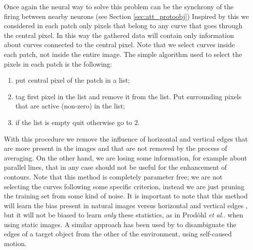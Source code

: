 \documentclass{llncs}
\makeatletter
\DeclareRobustCommand\onedot{\futurelet\@let@token\@onedot}
\def\@onedot{\ifx\@let@token.\else.\null\fi\xspace}
\def\etal{\emph{et al}\onedot}
\makeatother
\begin{document}
Once again the neural way to solve this problem can be the synchrony of the
firing between nearby neurons (see Section \ref{sec:att_protoobj})
Inspired by this we considered in each patch only pixels that belong to any
curve that goes through the central pixel. In this way the gathered data will
contain only information about curves connected to the central pixel.
Note that we select curves inside each patch, not inside the entire image.
The simple algorithm used to select the pixels in each patch is the following:
\begin{enumerate}
	\item put central pixel of the patch in a list;
	\item tag first pixel in the list and remove it from the list. Put surrounding pixels that are active (non-zero) in the list;
	\item if the list is empty quit otherwise go to $2$.
\end{enumerate}
With this procedure we remove the influence of horizontal and vertical edges that are more present in the images and
that are not removed by the process of averaging. On the other hand, we are losing some information, for example about parallel lines, that in any case should not be useful for the enhancement of contours.
Note that this method is completely parameter free; we are not selecting the curves following some specific criterion, instead we are just pruning the training set from some kind of noise.
It is important to note that this method will learn the bias present in natural images versus horizontal and vertical edges \cite{CoppolaPMP98}, but it will not be biased to learn \emph{only} these statistics, as in Prod\"ohl \etal \cite{Prodohl01} when using static images.
A similar approach has been used by \cite{Fitzpatrick03} to disambiguate the edges of a target object from the other of the environment, using self-caused motion.
\end{document}
